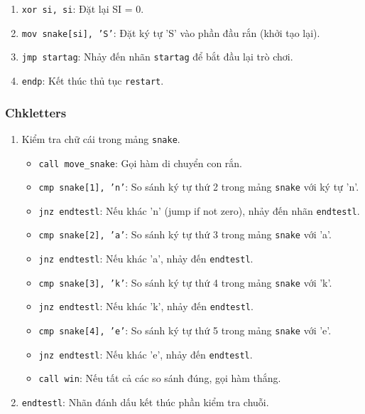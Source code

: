 \documentclass[12pt]{article}
\begin{document}
\begin{enumerate}[label=\textbf{\arabic*.}]
    \item \texttt{xor si, si}: Đặt lại SI = 0.
    \item \texttt{mov snake[si], 'S'}: Đặt ký tự 'S' vào phần đầu rắn (khởi tạo lại).
    \item \texttt{jmp startag}: Nhảy đến nhãn \texttt{startag} để bắt đầu lại trò chơi.
    \item \texttt{endp}: Kết thúc thủ tục \texttt{restart}.
\end{enumerate}

\subsubsection*{Chkletters}
\begin{enumerate}[label=\textbf{\arabic*.}]
      \begin{figure}[H]
  \centering
  \texttt{[image: pics/chkletters.png]}
\end{figure}
    \item \texttt{} Kiểm tra chữ cái trong mảng \texttt{snake}.

    \begin{itemize}
        \item \texttt{call move\_snake}: Gọi hàm di chuyển con rắn.
        \item \texttt{cmp snake[1], 'n'}: So sánh ký tự thứ 2 trong mảng \texttt{snake} với ký tự 'n'.
        \item \texttt{jnz endtestl}: Nếu khác 'n' (jump if not zero), nhảy đến nhãn \texttt{endtestl}.
        \item \texttt{cmp snake[2], 'a'}: So sánh ký tự thứ 3 trong mảng \texttt{snake} với 'a'.
        \item \texttt{jnz endtestl}: Nếu khác 'a', nhảy đến \texttt{endtestl}.
        \item \texttt{cmp snake[3], 'k'}: So sánh ký tự thứ 4 trong mảng \texttt{snake} với 'k'.
        \item \texttt{jnz endtestl}: Nếu khác 'k', nhảy đến \texttt{endtestl}.
        \item \texttt{cmp snake[4], 'e'}: So sánh ký tự thứ 5 trong mảng \texttt{snake} với 'e'.
        \item \texttt{jnz endtestl}: Nếu khác 'e', nhảy đến \texttt{endtestl}.
        \item \texttt{call win}: Nếu tất cả các so sánh đúng, gọi hàm thắng.
    \end{itemize}
    
    \item \texttt{endtestl}: Nhãn đánh dấu kết thúc phần kiểm tra chuỗi.
    

\end{enumerate}
\end{document}
